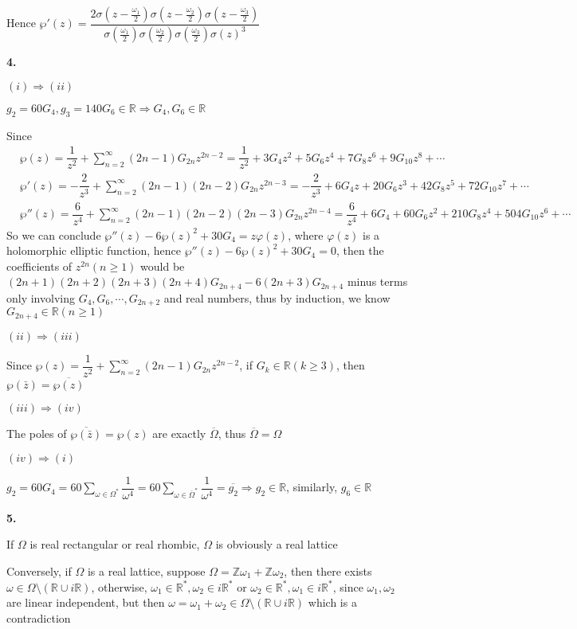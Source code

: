 \documentclass[12pt]{article}
\begin{document}
Hence $\wp'(z)=\dfrac{2\sigma\left(z-\frac{\omega_1}{2}\right)\sigma\left(z-\frac{\omega_2}{2}\right)\sigma\left(z-\frac{\omega_3}{2}\right)}{\sigma\left(\frac{\omega_1}{2}\right)\sigma\left(\frac{\omega_2}{2}\right)\sigma\left(\frac{\omega_3}{2}\right)\sigma(z)^3}$ \par
\textbf{4.} \par
$(i)\Rightarrow(ii)$ \par
$g_2=60G_4,g_3=140G_6\in\mathbb{R}\Rightarrow G_4,G_6\in\mathbb{R}$ \par
Since
\[
\begin{aligned}
&\wp(z)=\dfrac{1}{z^2}+\sum_{n=2}^{\infty}(2n-1)G_{2n}z^{2n-2}=\dfrac{1}{z^2}+3G_4z^2+5G_6z^4+7G_8z^6+9G_{10}z^8+\cdots \\
&\wp'(z)=-\dfrac{2}{z^3}+\sum_{n=2}^{\infty}(2n-1)(2n-2)G_{2n}z^{2n-3}=-\dfrac{2}{z^3}+6G_4z+20G_6z^3+42G_8z^5+72G_{10}z^7+\cdots \\
&\wp''(z)=\dfrac{6}{z^4}+\sum_{n=2}^{\infty}(2n-1)(2n-2)(2n-3)G_{2n}z^{2n-4}=\dfrac{6}{z^4}+6G_4+60G_6z^2+210G_8z^4+504G_{10}z^6+\cdots
\end{aligned}
\]
So we can conclude $\wp''(z)-6\wp(z)^2+30G_4=z\varphi(z)$, where $\varphi(z)$ is a holomorphic elliptic function, hence $\wp''(z)-6\wp(z)^2+30G_4=0$, then the coefficients of $z^{2n}(n\geq 1)$ would be $(2n+1)(2n+2)(2n+3)(2n+4)G_{2n+4}-6(2n+3)G_{2n+4}$ minus terms only involving $G_4,G_6,\cdots,G_{2n+2}$ and real numbers, thus by induction, we know $G_{2n+4}\in\mathbb{R}(n\geq 1)$ \par
$(ii)\Rightarrow(iii)$ \par
Since $\wp(z)=\dfrac{1}{z^2}+\sum_{n=2}^{\infty}(2n-1)G_{2n}z^{2n-2}$, if $G_k\in\mathbb{R}(k\geq 3)$, then $\wp(\bar{z})=\overline{\wp(z)}$ \par
$(iii)\Rightarrow(iv)$ \par
The poles of $\overline{\wp(\bar{z})}=\wp(z)$ are exactly $\overline{\Omega}$, thus $\overline{\Omega}=\Omega$ \par
$(iv)\Rightarrow(i)$ \par
$\displaystyle g_2=60G_4=60\sum_{\omega\in\Omega^*}\dfrac{1}{\omega^4}=60\sum_{\omega\in\overline{\Omega}^*}\dfrac{1}{\omega^4}=\overline{g_2}\Rightarrow g_2\in\mathbb{R}$, similarly, $g_6\in\mathbb{R}$ \par
\textbf{5.} \par
If $\Omega$ is real rectangular or real rhombic, $\Omega$ is obviously a real lattice \par
Conversely, if $\Omega$ is a real lattice, suppose $\Omega=\mathbb{Z}\omega_1+\mathbb{Z}\omega_2$, then there exists $\omega\in\Omega\setminus(\mathbb{R}\cup i\mathbb{R})$, otherwise, $\omega_1\in\mathbb{R}^*,\omega_2\in i\mathbb{R}^*$ or $\omega_2\in\mathbb{R}^*,\omega_1\in i\mathbb{R}^*$, since $\omega_1,\omega_2$ are linear independent, but then $\omega=\omega_1+\omega_2\in\Omega\setminus(\mathbb{R}\cup i\mathbb{R})$ which is a contradiction \par
\end{document}
